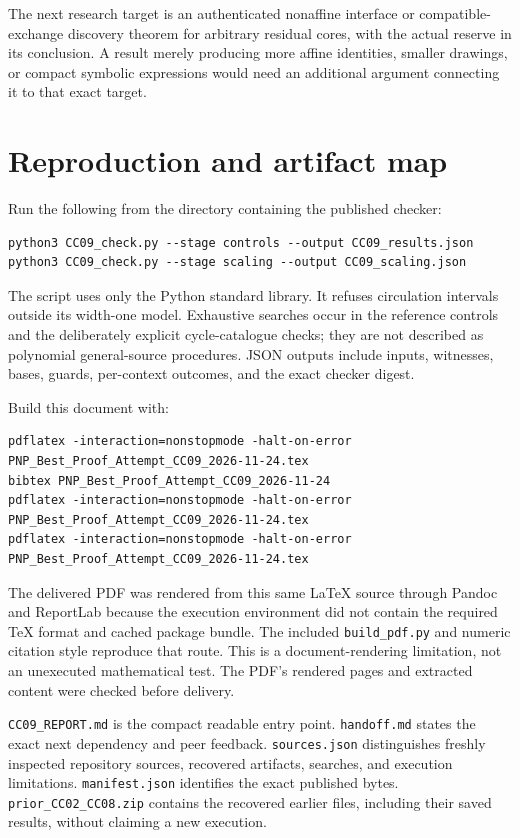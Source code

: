 \documentclass[11pt,letterpaper]{article}
\theoremstyle{definition}
\begin{document}
The next research target is an authenticated nonaffine interface or compatible-exchange discovery theorem for arbitrary residual cores, with the actual reserve in its conclusion. A result merely producing more affine identities, smaller drawings, or compact symbolic expressions would need an additional argument connecting it to that exact target.

\appendix
\section{Reproduction and artifact map}

Run the following from the directory containing the published checker:
\begin{lstlisting}
python3 CC09_check.py --stage controls --output CC09_results.json
python3 CC09_check.py --stage scaling --output CC09_scaling.json
\end{lstlisting}
The script uses only the Python standard library. It refuses circulation intervals outside its width-one model. Exhaustive searches occur in the reference controls and the deliberately explicit cycle-catalogue checks; they are not described as polynomial general-source procedures. JSON outputs include inputs, witnesses, bases, guards, per-context outcomes, and the exact checker digest.

Build this document with:
\begin{lstlisting}
pdflatex -interaction=nonstopmode -halt-on-error PNP_Best_Proof_Attempt_CC09_2026-11-24.tex
bibtex PNP_Best_Proof_Attempt_CC09_2026-11-24
pdflatex -interaction=nonstopmode -halt-on-error PNP_Best_Proof_Attempt_CC09_2026-11-24.tex
pdflatex -interaction=nonstopmode -halt-on-error PNP_Best_Proof_Attempt_CC09_2026-11-24.tex
\end{lstlisting}

The delivered PDF was rendered from this same LaTeX source through Pandoc and ReportLab because the execution environment did not contain the required TeX format and cached package bundle. The included \texttt{build\_pdf.py} and numeric citation style reproduce that route. This is a document-rendering limitation, not an unexecuted mathematical test. The PDF's rendered pages and extracted content were checked before delivery.

\texttt{CC09\_REPORT.md} is the compact readable entry point. \texttt{handoff.md} states the exact next dependency and peer feedback. \texttt{sources.json} distinguishes freshly inspected repository sources, recovered artifacts, searches, and execution limitations. \texttt{manifest.json} identifies the exact published bytes. \texttt{prior\_CC02\_CC08.zip} contains the recovered earlier files, including their saved results, without claiming a new execution.



\end{document}

